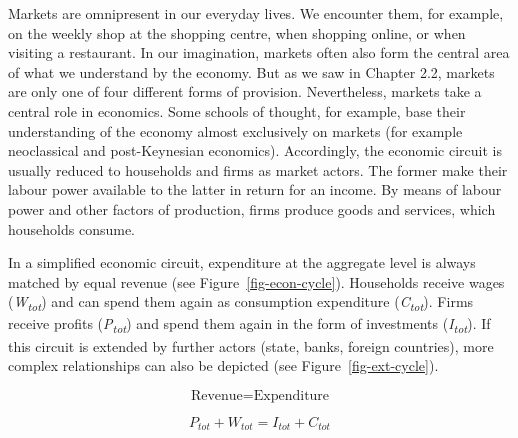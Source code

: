\documentclass[
  british,
  a4paper,
  DIV=11,
  numbers=noendperiod,
  oneside,
  openany]{scrreprt}
\begin{document}
Markets are omnipresent in our everyday lives. We encounter them, for
example, on the weekly shop at the shopping centre, when shopping
online, or when visiting a restaurant. In our imagination, markets often
also form the central area of what we understand by the economy. But as
we saw in Chapter 2.2, markets are only one of four different forms of
provision. Nevertheless, markets take a central role in economics. Some
schools of thought, for example, base their understanding of the economy
almost exclusively on markets (for example neoclassical and
post-Keynesian economics). Accordingly, the economic circuit is usually
reduced to households and firms as market actors. The former make their
labour power available to the latter in return for an income. By means
of labour power and other factors of production, firms produce goods and
services, which households consume.

In a simplified economic circuit, expenditure at the aggregate level is
always matched by equal revenue (see Figure~\ref{fig-econ-cycle}).
Households receive wages (\emph{W\textsubscript{tot}}) and can spend
them again as consumption expenditure (\emph{C\textsubscript{tot}}).
Firms receive profits (\emph{P\textsubscript{tot}}) and spend them again
in the form of investments (\emph{I\textsubscript{tot}}). If this
circuit is extended by further actors (state, banks, foreign countries),
more complex relationships can also be depicted (see
Figure~\ref{fig-ext-cycle}).

\[\text{Revenue} = \text{Expenditure}\]

\[P_{tot} + W_{tot} = I_{tot} + C_{tot}\]
\end{document}
